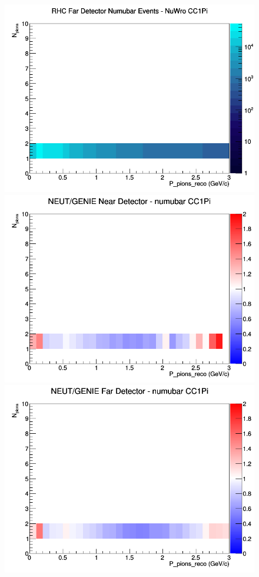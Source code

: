 \documentclass[12pt]{article}
\begin{document}
\begin{figure}[h]
\endminipage
{}
\includegraphics[width=\linewidth]{eff_N_P/FGT/pions/CC1Pi_RHC_FD_numubar_N_P_NuWro.png}
\endminipage
\newline
{}
\includegraphics[width=\linewidth]{eff_N_P/FGT/pions/ratios/CC1Pi_NEUT_GENIE_numubar_near_N_P.png}
\endminipage
{}
\includegraphics[width=\linewidth]{eff_N_P/FGT/pions/ratios/CC1Pi_NEUT_GENIE_numubar_far_N_P.png}

\end{figure}
\end{document}
